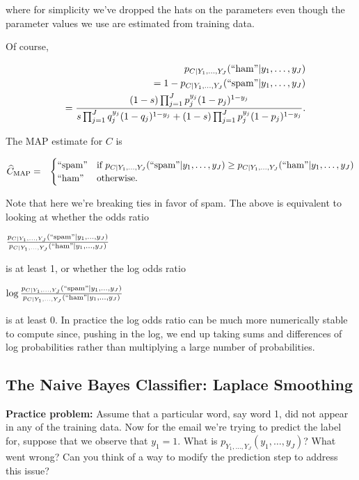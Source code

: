 where for simplicity we've dropped the hats on the parameters even though the parameter values we use are estimated from training data.

Of course,

\begin{eqnarray*}
&&p_{C|Y_{1},\dots,Y_{J}}(``\text{ham}"|y_{1},\dots,y_{J}) \\
&&= 1 - p_{C|Y_{1},\dots,Y_{J}}(``\text{spam}"|y_{1},\dots,y_{J}) \\
&&=
\frac{(1-s)\prod_{j=1}^{J}p_{j}^{y_{j}}(1-p_{j})^{1-y_{j}}}{s\prod_{j=1}^{J}q_{j}^{y_{j}}(1-q_{j})^{1-y_{j}}+(1-s)\prod_{j=1}^{J}p_{j}^{y_{j}}(1-p_{j})^{1-y_{j}}}.
\end{eqnarray*}

The MAP estimate for $C$ is

\begin{eqnarray*}
\widehat{C}_{\text{MAP}}
&=&
\begin{cases}
``\text{spam}"
& \text{if }
p_{C|Y_{1},\dots,Y_{J}}(``\text{spam}"|y_{1},\dots,y_{J})
\ge p_{C|Y_{1},\dots,Y_{J}}(``\text{ham}"|y_{1},\dots,y_{J}) \\
``\text{ham}"
& \text{otherwise}.
\end{cases}
\end{eqnarray*}

Note that here we're breaking ties in favor of spam. The above is equivalent to looking at whether the odds ratio

{\centering$\frac{p_{C|Y_{1},\dots ,Y_{J}}(``\text {spam}"|y_{1},\dots ,y_{J})}{p_{C|Y_{1},\dots ,Y_{J}}(``\text {ham}"|y_{1},\dots ,y_{J})}$ \par}
 
is at least 1, or whether the log odds ratio

{\centering$\log \frac{p_{C|Y_{1},\dots ,Y_{J}}(``\text {spam}"|y_{1},\dots ,y_{J})}{p_{C|Y_{1},\dots ,Y_{J}}(``\text {ham}"|y_{1},\dots ,y_{J})}$ \par}

is at least 0. In practice the log odds ratio can be much more numerically stable to compute since, pushing in the log, we end up taking sums and differences of log probabilities rather than multiplying a large number of probabilities.

\subsection{The Naive Bayes Classifier: Laplace Smoothing}

\textbf{Practice problem:} Assume that a particular word, say word 1, did not appear in any of the training data. Now for the email we're trying to predict the label for, suppose that we observe that $y_1=1$. What is $p_{Y_{1},\dots ,Y_{J}}(y_{1},\dots ,y_{J})$? What went wrong? Can you think of a way to modify the prediction step to address this issue?

